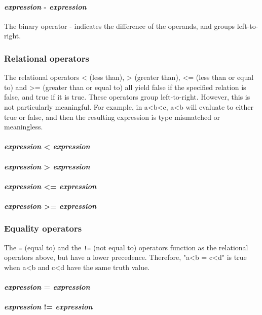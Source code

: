 \paragraph{\textit{expression} - \textit{expression}}
The binary  operator - indicates the difference of the operands, and groups left-to-right.
\\
\subsubsection{Relational operators}
The  relational operators < (less than), > (greater than), <= (less than or equal to) and >= (greater than or equal to) all yield false if the specified relation is false, and true if it is true. These operators group left-to-right. However, this is not particularly meaningful. For example, in a<b<c, a<b will evaluate to either true or false, and then the resulting expression is type mismatched or meaningless.

\paragraph{\textit{expression} < \textit{expression}}
\paragraph{\textit{expression} > \textit{expression}}
\paragraph{\textit{expression} <= \textit{expression}}
\paragraph{\textit{expression} >= \textit{expression}}


\subsubsection{Equality operators}
The \texttt{=} (equal to) and the \texttt{!=} (not equal to) operators function as the relational operators above, but have a lower precedence. Therefore, "a<b = c<d" is true when a<b and c<d have the same truth value.
\\
\paragraph{\textit{expression} = \textit{expression}}
\paragraph{\textit{expression} != \textit{expression}}

